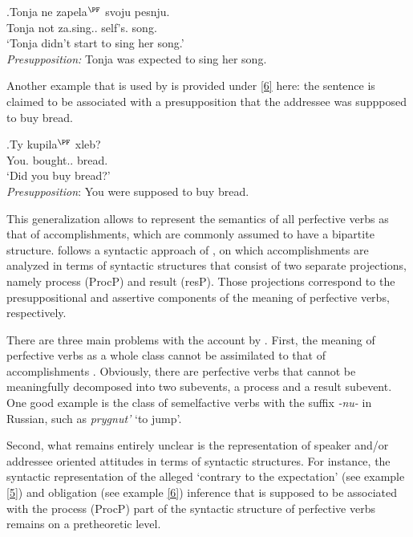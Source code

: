 \exg.\label{5}Tonja ne zapela$^{\PF}$ svoju pesnju.\\
Tonja not za.sing.. self's. song.\\
\trans `Tonja didn't start to sing her song.'\\
\textit{Presupposition:} Tonja was expected to sing her song.\\

Another example that is used by \citet{Romanova:06} is provided under \ref{6} here: the sentence is claimed to be associated with a presupposition that the addressee was suppposed to buy bread.

\exg.\label{6}Ty kupila$^{\PF}$ xleb?\\
You. bought.. bread.\\
\trans `Did you buy bread?'\\
\textit{Presupposition}: You were supposed to buy bread.\\

This generalization allows \citet{Romanova:06} to represent the semantics of all perfective verbs as that of accomplishments, which are commonly assumed to have a bipartite structure. \citet{Romanova:06} follows a syntactic approach of \citet{Ramchand:04}, on which accomplishments are analyzed in terms of syntactic structures that consist of two separate projections, namely process (ProcP) and result (resP). Those projections correspond to the presuppositional and assertive components of the meaning of perfective verbs, respectively. 

There are three main problems with the account by \citet{Romanova:06}. First, the meaning of perfective verbs as a whole class cannot be assimilated to that of accomplishments \citep[for counterarguments see][]{Filip:00, FilipRothstein:05}. Obviously, there are perfective verbs that cannot be meaningfully decomposed into two subevents, a process and a result subevent. One good example is the class of semelfactive verbs with the suffix \textit{-nu-} in Russian, such as \textit{prygnut'} `to jump'. 

 Second, what remains entirely unclear is the representation of speaker and/or addressee oriented attitudes in terms of syntactic structures. For instance, the syntactic representation of the alleged `contrary to the expectation' (see example \ref{5}) and obligation (see example \ref{6}) inference that is supposed to be associated with the process (ProcP) part of the syntactic structure of perfective verbs remains on a pretheoretic level.

